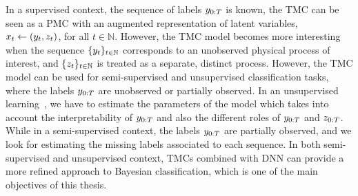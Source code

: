 In a supervised context, the sequence of labels $y_{0:T}$ is known, the
TMC can be seen as a PMC with an augmented representation of latent variables,
\ie~$x_t \leftarrow (y_t, z_t)$, for all $t \in \mathbb{N}$.
 However, the TMC
model becomes more interesting when the sequence $\{y_t\}_{t\in \mathbb{N}}$
corresponds to an unobserved  physical process of interest, and $\{z_t\}_{t\in
\mathbb{N}}$ is treated as a separate, distinct process.
However, the TMC model can be used for semi-supervised and unsupervised
classification tasks, where the labels $y_{0:T}$ are unobserved or
partially observed. In an unsupervised learning~\citep{lanchantin2004unsupervised}, 
we have to estimate the
parameters of the model which takes into account the interpretability of
$y_{0:T}$ and also the different roles of $y_{0:T}$ and $z_{0:T}$.
While in a semi-supervised context, the labels $y_{0:T}$ are partially observed, and
we look for estimating the missing labels associated to each sequence.
In both semi-supervised and unsupervised context, TMCs
combined with DNN can provide a more refined approach to Bayesian classification, 
which is one of the main objectives of this thesis.\\













